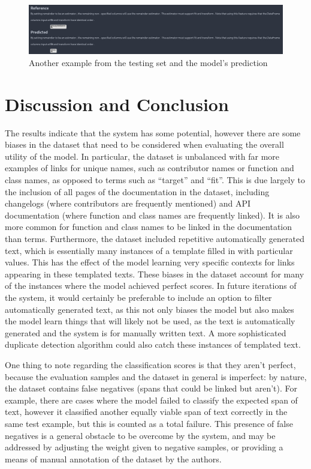 \documentclass[manuscript,screen,review]{acmart}
\begin{document}
\begin{figure}[htbp]
\centering
\includegraphics[width=450px]{screenshots/Writeup/2023-04-10_12-51-26_screenshot.png}
\caption{\label{fig:org8928d03}Another example from the testing set and the model's prediction}
\end{figure}

\section*{Discussion and Conclusion}
\label{sec:orgabd4620}

The results indicate that the system has some potential, however there
are some biases in the dataset that need to be considered when
evaluating the overall utility of the model. In particular, the
dataset is unbalanced with far more examples of links for unique
names, such as contributor names or function and class names, as
opposed to terms such as ``target'' and ``fit''. This is due largely to
the inclusion of all pages of the documentation in the dataset,
including changelogs (where contributors are frequently mentioned) and
API documentation (where function and class names are frequently
linked). It is also more common for function and class names to be
linked in the documentation than terms. Furthermore, the dataset
included repetitive automatically generated text, which is essentially
many instances of a template filled in with particular values. This
has the effect of the model learning very specific contexts for links
appearing in these templated texts. These biases in the dataset
account for many of the instances where the model achieved perfect
scores. In future iterations of the system, it would certainly be
preferable to include an option to filter automatically generated
text, as this not only biases the model but also makes the model learn
things that will likely not be used, as the text is automatically
generated and the system is for manually written text. A more
sophisticated duplicate detection algorithm could also catch these
instances of templated text.

One thing to note regarding the classification scores is that they
aren't perfect, because the evaluation samples and the dataset in
general is imperfect: by nature, the dataset contains false negatives
(spans that could be linked but aren't). For example, there are cases
where the model failed to classify the expected span of text, however
it classified another equally viable span of text correctly in the
same test example, but this is counted as a total failure. This
presence of false negatives is a general obstacle to be overcome by
the system, and may be addressed by adjusting the weight given to
negative samples, or providing a means of manual annotation of the
dataset by the authors.
\end{document}
